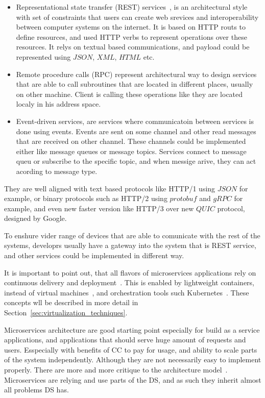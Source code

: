 \begin{itemize}
	\item Representational state transfer (REST) services~\cite{AdamczykSJH11}, is an architectural style with set of constraints that users can create web srevices and interoperability between computer systems on the internet. It is based on HTTP routs to define resources, and used HTTP verbs to represent operations over these resources. It relys on textual based communications, and payload could be represented using $JSON$, $XML$, $HTML$ etc.
	\item Remote procedure calls (RPC) represent architectural way to design services that are able to call subroutines that are located in different places, usually on other machine. Client is calling these operations like they are located localy in his address space.
	\item Event-driven services, are services where communicatoin between services is done using events. Events are sent on some channel and other read messages that are received on other channel. These channels could be implemented either like message queues or message topics. Services connect to message queu or subscribe to the specific topic, and when messige arive, they can act acording to message type.
\end{itemize}
 
 They are well aligned with text based protocols like HTTP/1 using $JSON$ for example, or binary protocols such as HTTP/2 using $protobuf$ and $gRPC$ for example, and even new faster version like HTTP/3 over new $QUIC$ protocol, designed by Google. 
 
 To enshure vider range of devices that are able to comunicate with the rest of the systems, developrs usually have a gateway into the system that is REST service, and other services could be implemented in different way.

It is important to point out, that all flavors of microservices applications rely on continuous delivery and deployment~\cite{7436659}. This is enabled by lightweight containers, instead of virtual machines~\cite{FelterFRR15}, and orchestration tools such Kubernetes~\cite{BurnsGOBW16}. These concepts wll be described in more detail in Section~\ref{sec:virtualization_techniques}.

Microservices architecture are good starting point especially for build as a service applications, and applications that should serve huge amount of requests and users. Esspecially with benefits of CC to pay for usage, and ability to scale parts of the system independently.  Although they are not necessarily easy to implement properly. There are more and more critique to the architecture model~\cite{SoldaniTH18}. Microservices are relying and use parts of the DS, and as such they inherit almost all problems DS has. 

